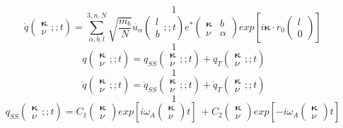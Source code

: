 \[1\] 
\[\dot{q}\left( \begin{array}{c}
{\mathbf \kappa } \\ 
\nu  \end{array}
;;t\right)=\sum\limits^{3,n,N}_{\alpha ,b,l}{\sqrt{\frac{m_b}{N}}}\dot{u_{\alpha }}\left( \begin{array}{c}
l \\ 
b \end{array}
;;t\right)e^*\left( \begin{array}{cc}
{\mathbf \kappa } & b \\ 
\nu  & \alpha  \end{array}
\right){exp \left[i{\mathbf \kappa }\cdot r_0\left( \begin{array}{c}
l \\ 
0 \end{array}
\right)\right]\ }\] 
\[1\] 
\[q\left( \begin{array}{c}
{\mathbf \kappa } \\ 
\nu  \end{array}
;;t\right)=q_{SS}\left( \begin{array}{c}
{\mathbf \kappa } \\ 
\nu  \end{array}
;;t\right)+q_T\left( \begin{array}{c}
{\mathbf \kappa } \\ 
\nu  \end{array}
;;t\right)\] 
\[1\] 
\[\dot{q}\left( \begin{array}{c}
{\mathbf \kappa } \\ 
\nu  \end{array}
;;t\right)={\dot{q}}_{SS}\left( \begin{array}{c}
{\mathbf \kappa } \\ 
\nu  \end{array}
;;t\right)+{\dot{q}}_T\left( \begin{array}{c}
{\mathbf \kappa } \\ 
\nu  \end{array}
;;t\right)\] 
\[1\] 
\[q_{SS}\left( \begin{array}{c}
{\mathbf \kappa } \\ 
\nu  \end{array}
;;t\right)=C_1\left( \begin{array}{c}
{\mathbf \kappa } \\ 
\nu  \end{array}
\right){exp \left[i{\omega }_A\left( \begin{array}{c}
{\mathbf \kappa } \\ 
\nu  \end{array}
\right)t\right]\ }+C_2\left( \begin{array}{c}
{\mathbf \kappa } \\ 
\nu  \end{array}
\right){exp \left[-i{\omega }_A\left( \begin{array}{c}
{\mathbf \kappa } \\ 
\nu  \end{array}
\right)t\right]\ }\] 
